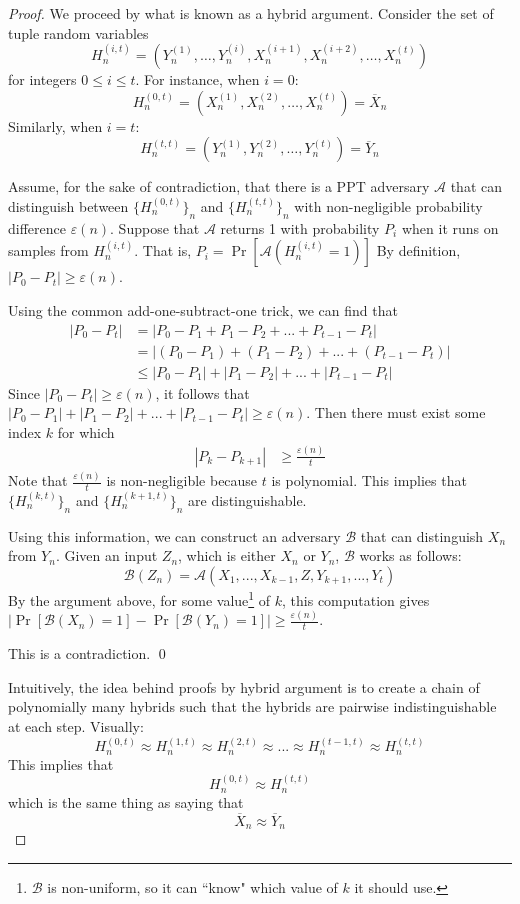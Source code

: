 \documentclass[12pt]{tufte-book}
\newcommand{\ma}{\mathcal{A}}
\newcommand{\mb}{\mathcal{B}}
\begin{document}
\begin{proof}
We proceed by what is known as a hybrid argument.
Consider the set of tuple random variables
$$H^{(i,t)}_n = (Y_n^{(1)},\hdots,Y_n^{(i)},X_n^{(i+1)},X_n^{(i+2)},\hdots,X_n^{(t)})$$
for integers $0\le i\le t$. 
For instance, when $i=0$:
$$H^{(0,t)}_n = (X_n^{(1)},X_n^{(2)},\hdots,X_n^{(t)}) = \overline{X}_n$$
Similarly, when $i=t$:
$$H^{(t,t)}_n = (Y_n^{(1)},Y_n^{(2)},\hdots,Y_n^{(t)}) = \overline{Y}_n$$

Assume, for the sake of contradiction, that there is a PPT adversary $\ma$ that can distinguish between $\{H^{(0,t)}_n\}_n$ and $\{H^{(t,t)}_n\}_n$ with non-negligible probability difference $\varepsilon(n)$. Suppose that $\ma$ returns 1 with probability $P_i$ when it runs on samples from $H^{(i,t)}_n$. 
That is, $P_i = \Pr[\ma(H^{(i,t)}_n = 1)]$
By definition, $|P_0 - P_t|\ge \varepsilon(n)$. 

Using the common add-one-subtract-one trick, we can find that
\begin{align*}
|P_0 - P_t| &= |P_0 - P_{1} + P_{1} - P_{2} + ... + P_{t-1} - P_{t}| \\
&= |(P_0 - P_{1}) + (P_{1} - P_{2}) + ... + (P_{t-1} - P_{t})| \\
&\leq  |P_0 - P_{1}| + |P_{1} - P_{2}| + ... + |P_{t-1} - P_{t}|
\end{align*}
Since $|P_0 - P_t| \ge \varepsilon(n)$, it follows that $|P_0 - P_{1}| + |P_{1} - P_{2}| + ... + |P_{t-1} - P_{t}| \ge \varepsilon(n)$.
Then there must exist some index $k$ for which
\begin{align*}
|P_k - P_{k+1}| &\geq \frac{\varepsilon(n)}{t}
\end{align*}
Note that $\frac{\varepsilon(n)}{t}$ is non-negligible because $t$ is polynomial.
This implies that $\{H^{(k,t)}_n\}_n$ and $\{H^{(k+1,t)}_n\}_n$ are distinguishable.

Using this information, we can construct an adversary $\mb$ that can distinguish $X_n$ from $Y_n$.
Given an input $Z_n$, which is either $X_n$ or $Y_n$, $\mb$ works as follows:
$$\mb(Z_n) = \ma(X_1, ..., X_{k-1}, Z, Y_{k+1}, ..., Y_t)$$
By the argument above, for some value\footnote{$\mb$ is non-uniform, so it can ``know" which value of $k$ it should use.} of $k$, this computation gives $|\Pr[\mb(X_n)=1] - \Pr[\mb(Y_n) = 1]| \ge \frac{\varepsilon(n)}{t}$.


This is a contradiction. 
\qed

Intuitively, the idea behind proofs by hybrid argument is to create a chain of polynomially many hybrids such that the hybrids are pairwise indistinguishable at each step.
Visually:
$$H^{(0,t)}_n \approx H^{(1,t)}_n \approx H^{(2,t)}_n \approx ... \approx H^{(t-1,t)}_n \approx H^{(t,t)}_n$$
This implies that 
$$H^{(0,t)}_n \approx H^{(t,t)}_n$$
which is the same thing as saying that
$$\overline{X}_n \approx \overline{Y}_n$$


\end{proof}
\end{document}
